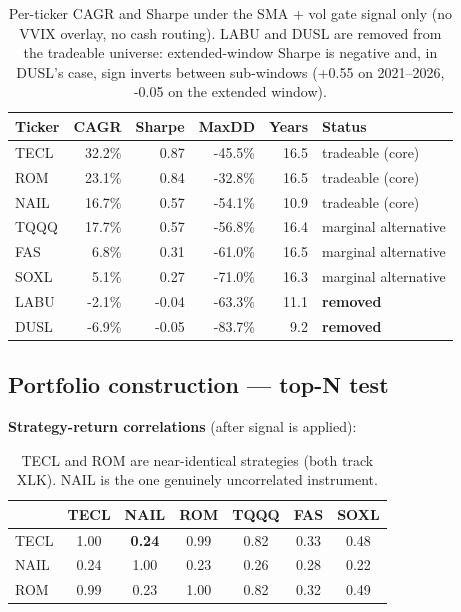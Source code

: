 \documentclass[11pt,a4paper]{article}
\begin{document}
\begin{table}[H]
\centering
\small
\renewcommand{\arraystretch}{1.15}
\begin{tabular}{lrrrrl}
\toprule
\textbf{Ticker} & \textbf{CAGR} & \textbf{Sharpe} & \textbf{MaxDD} & \textbf{Years} & \textbf{Status} \\
\midrule
\rowcolor{green!10} TECL & 32.2\% & 0.87 & -45.5\% & 16.5 & tradeable (core) \\
\rowcolor{green!10} ROM  & 23.1\% & 0.84 & -32.8\% & 16.5 & tradeable (core) \\
\rowcolor{green!10} NAIL & 16.7\% & 0.57 & -54.1\% & 10.9 & tradeable (core) \\
TQQQ & 17.7\% & 0.57 & -56.8\% & 16.4 & marginal alternative \\
FAS  & 6.8\%  & 0.31 & -61.0\% & 16.5 & marginal alternative \\
SOXL & 5.1\%  & 0.27 & -71.0\% & 16.3 & marginal alternative \\
\rowcolor{red!5} LABU & -2.1\% & -0.04 & -63.3\% & 11.1 & \textbf{removed} \\
\rowcolor{red!5} DUSL & -6.9\% & -0.05 & -83.7\% & 9.2  & \textbf{removed} \\
\bottomrule
\end{tabular}
\caption{Per-ticker CAGR and Sharpe under the SMA + vol gate signal only (no VVIX overlay, no cash routing). LABU and DUSL are removed from the tradeable universe: extended-window Sharpe is negative and, in DUSL's case, sign inverts between sub-windows (+0.55 on 2021--2026, -0.05 on the extended window).}
\end{table}

\subsection{Portfolio construction --- top-N test}

\textbf{Strategy-return correlations} (after signal is applied):

\begin{table}[H]
\centering
\small
\begin{tabular}{lcccccc}
\toprule
       & TECL & NAIL & ROM & TQQQ & FAS & SOXL \\
\midrule
TECL   & 1.00 & \textbf{0.24} & 0.99 & 0.82 & 0.33 & 0.48 \\
NAIL   & 0.24 & 1.00 & 0.23 & 0.26 & 0.28 & 0.22 \\
ROM    & 0.99 & 0.23 & 1.00 & 0.82 & 0.32 & 0.49 \\
\bottomrule
\end{tabular}
\caption{TECL and ROM are near-identical strategies (both track XLK). NAIL is the one genuinely uncorrelated instrument.}
\end{table}
\end{document}

